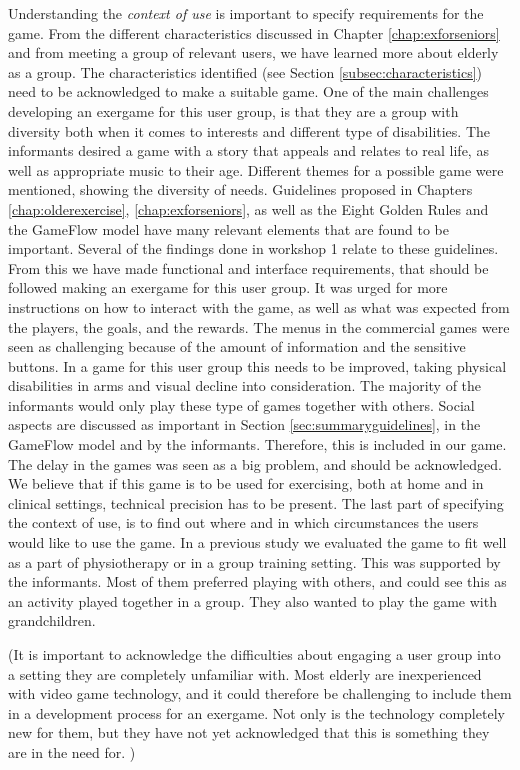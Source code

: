 Understanding the \emph{context of use} is important to specify requirements for the game. From the different characteristics discussed in Chapter \ref{chap:exforseniors} and from meeting a group of relevant users, we have learned more about elderly as a group. The characteristics identified (see Section \ref{subsec:characteristics}) need to be acknowledged to make a suitable game. One of the main challenges developing an exergame for this user group, is that they are a group with diversity both when it comes to interests and different type of disabilities. The informants desired a game with a story that appeals and relates to real life, as well as appropriate music to their age. Different themes for a possible game were mentioned, showing the diversity of needs. Guidelines proposed in Chapters \ref{chap:olderexercise}, \ref{chap:exforseniors}, as well as the Eight Golden Rules and the GameFlow model have many relevant elements that are found to be important. Several of the findings done in workshop 1 relate to these guidelines. From this we have made functional and interface requirements, that should be followed making an exergame for this user group. It was urged for more instructions on how to interact with the game, as well as what was expected from the players, the goals, and the rewards. The menus in the commercial games were seen as challenging because of the amount of information and the sensitive buttons. In a game for this user group this needs to be improved, taking physical disabilities in arms and visual decline into consideration. The majority of the informants would only play these type of games together with others. Social aspects are discussed as important in Section \ref{sec:summaryguidelines}, in the GameFlow model and by the informants. Therefore, this is included in our game. The delay in the games was seen as a big problem, and should be acknowledged. We believe that if this game is to be used for exercising, both at home and in clinical settings, technical precision has to be present. The last part of specifying the context of use, is to find out where and in which circumstances the users would like to use the game. In a previous study \cite{project} we evaluated the game to fit well as a part of physiotherapy or in a group training setting. This was supported by the informants. Most of them preferred playing with others, and could see this as an activity played together in a group. They also wanted to play the game with grandchildren.

(It is important to acknowledge the difficulties about engaging a user group into a setting they are completely unfamiliar with. Most elderly are inexperienced with video game technology, and it could therefore be challenging to include them in a development process for an exergame. Not only is the technology completely new for them, but they have not yet acknowledged that this is something they are in the need for. )


